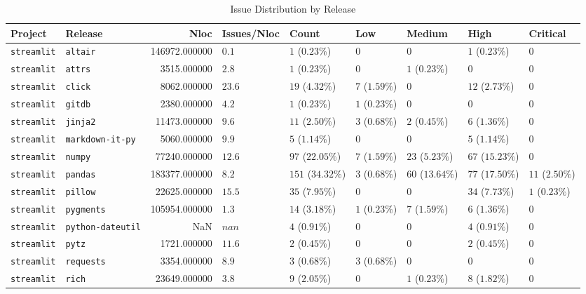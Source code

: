 \begin{table}
\caption{Issue Distribution by Release}
\label{tab:issue-release-distribution}
\begin{tabular}{llrllllll}
\toprule
Project & Release & Nloc & Issues/Nloc & Count & Low & Medium & High & Critical \\
\midrule
\texttt{streamlit} & \texttt{altair} & 146972.000000 & $0.1$ & $1$ ($0.23\%$) & $0$ & $0$ & $1$ ($0.23\%$) & $0$ \\
\texttt{streamlit} & \texttt{attrs} & 3515.000000 & $2.8$ & $1$ ($0.23\%$) & $0$ & $1$ ($0.23\%$) & $0$ & $0$ \\
\texttt{streamlit} & \texttt{click} & 8062.000000 & $23.6$ & $19$ ($4.32\%$) & $7$ ($1.59\%$) & $0$ & $12$ ($2.73\%$) & $0$ \\
\texttt{streamlit} & \texttt{gitdb} & 2380.000000 & $4.2$ & $1$ ($0.23\%$) & $1$ ($0.23\%$) & $0$ & $0$ & $0$ \\
\texttt{streamlit} & \texttt{jinja2} & 11473.000000 & $9.6$ & $11$ ($2.50\%$) & $3$ ($0.68\%$) & $2$ ($0.45\%$) & $6$ ($1.36\%$) & $0$ \\
\texttt{streamlit} & \texttt{markdown-it-py} & 5060.000000 & $9.9$ & $5$ ($1.14\%$) & $0$ & $0$ & $5$ ($1.14\%$) & $0$ \\
\texttt{streamlit} & \texttt{numpy} & 77240.000000 & $12.6$ & $97$ ($22.05\%$) & $7$ ($1.59\%$) & $23$ ($5.23\%$) & $67$ ($15.23\%$) & $0$ \\
\texttt{streamlit} & \texttt{pandas} & 183377.000000 & $8.2$ & $151$ ($34.32\%$) & $3$ ($0.68\%$) & $60$ ($13.64\%$) & $77$ ($17.50\%$) & $11$ ($2.50\%$) \\
\texttt{streamlit} & \texttt{pillow} & 22625.000000 & $15.5$ & $35$ ($7.95\%$) & $0$ & $0$ & $34$ ($7.73\%$) & $1$ ($0.23\%$) \\
\texttt{streamlit} & \texttt{pygments} & 105954.000000 & $1.3$ & $14$ ($3.18\%$) & $1$ ($0.23\%$) & $7$ ($1.59\%$) & $6$ ($1.36\%$) & $0$ \\
\texttt{streamlit} & \texttt{python-dateutil} & NaN & $nan$ & $4$ ($0.91\%$) & $0$ & $0$ & $4$ ($0.91\%$) & $0$ \\
\texttt{streamlit} & \texttt{pytz} & 1721.000000 & $11.6$ & $2$ ($0.45\%$) & $0$ & $0$ & $2$ ($0.45\%$) & $0$ \\
\texttt{streamlit} & \texttt{requests} & 3354.000000 & $8.9$ & $3$ ($0.68\%$) & $3$ ($0.68\%$) & $0$ & $0$ & $0$ \\
\texttt{streamlit} & \texttt{rich} & 23649.000000 & $3.8$ & $9$ ($2.05\%$) & $0$ & $1$ ($0.23\%$) & $8$ ($1.82\%$) & $0$ \\

\end{tabular}
\end{table}
